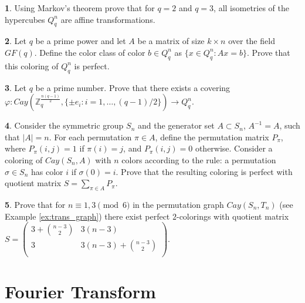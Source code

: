 \documentclass[11pt]{article}
\theoremstyle{definition}
\newtheorem{exercise}{\quad}
\begin{document}
{{{\begin{exercise}\label{exer6}
Using Markov's theorem prove  that for $q=2$ and $q=3$, all
isometries of the hypercubes $Q^n_q$ are affine transformations.
\end{exercise}

\begin{exercise}
Let $q$ be a prime power and let $A$ be a matrix of size
$k\times n$ over the field $GF(q)$. Define the color class of color
$b\in Q^n_q$ as $\{x\in Q^n_q : Ax=b\}$. Prove that this
coloring of  $Q^n_q$ is perfect.
\end{exercise}

\begin{exercise}
Let $q$ be a prime number. Prove that there exists a covering $\varphi: Cay(\mathbb{Z}^{\frac{n(q-1)}{2}}_q,\{\pm e_i : i=1,\dots, (q-1)/2\})\rightarrow Q_q^n.$
\end{exercise}


\begin{exercise}\label{exerCayCol}
Consider the symmetric group $S_n$ and the generator set
$A\subset S_n$, $A^{-1}=A$, such that $|A|=n$. For each permutation $\pi\in
A$, define the permutation matrix $P_\pi$, where $P_\pi(i,j)=1$ if
$\pi(i)=j$, and $P_\pi(i,j)=0$ otherwise. Consider a
coloring of $Cay(S_n,A)$ with $n$ colors according to the rule: a permutation
$\sigma\in S_n$ has color $i$ if $\sigma(0)=i$. Prove that
the resulting coloring is perfect with quotient matrix
$S=\sum\limits_{\pi\in A}P_\pi$.
\end{exercise}


\begin{exercise}
Prove that for $n\equiv 1,3\pmod 6$ in the permutation graph
$Cay(S_n,T_n)$ (see Example  \ref{ex:trans_graph}) there exist perfect $2$-colorings 
with quotient matrix\\
$S=\left(\begin{array}{cc}
3+{n-3 \choose 2}& 3(n-3) \\
3 &  3(n-3)+{n-3 \choose 2}\\
\end{array} \right)$.
\end{exercise}







\section{Fourier Transform}\label{Four}

}}}
\end{document}

